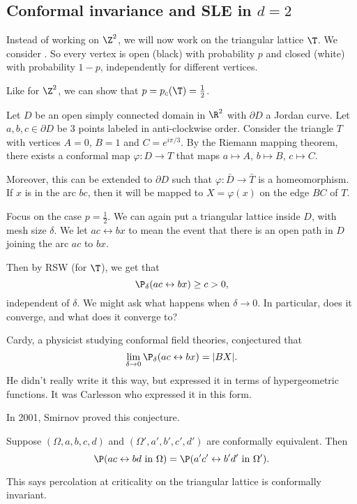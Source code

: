 \documentclass[a4paper]{article}
\begin{document}
\subsection{Conformal invariance and SLE in \texorpdfstring{$d = 2$}{d = 2}}
Instead of working on $\Z^2$, we will now work on the triangular lattice $\T$. We consider . So every vertex is open (black) with probability $p$ and closed (white) with probability $1 - p$, independently for different vertices.

Like for $\Z^2$, we can show that $p = p_c(\T) = \frac{1}{2}$.

Let $D$ be an open simply connected domain in $\R^2$ with $\partial D$ a Jordan curve. Let $a, b, c \in \partial D$ be $3$ points labeled in anti-clockwise order. Consider the triangle $T$ with vertices $A = 0$, $B = 1$ and $C = e^{i\pi/3}$. By the Riemann mapping theorem, there exists a conformal map $\varphi: D \to T$ that maps $a \mapsto A$, $b \mapsto B$, $c \mapsto C$.

Moreover, this can be extended to $\partial D$ such that $\varphi: \bar{D} \to \bar{T}$ is a homeomorphism. If $x$ is in the arc $bc$, then it will be mapped to $X = \varphi(x)$ on the edge $BC$ of $T$.

Focus on the case $p = \frac{1}{2}$. We can again put a triangular lattice inside $D$, with mesh size $\delta$. We let $ac \leftrightarrow bx$ to mean the event that there is an open path in $D$ joining the arc $ac$ to $bx$.

Then by RSW (for $\T$), we get that
\[
  \P_\delta(ac \leftrightarrow bx) \geq c > 0,
\]
independent of $\delta$. We might ask what happens when $\delta \to 0$. In particular, does it converge, and what does it converge to?

Cardy, a physicist studying conformal field theories, conjectured that
\[
  \lim_{\delta \to 0} \P_\delta(ac \leftrightarrow bx) = |BX|.
\]
He didn't really write it this way, but expressed it in terms of hypergeometric functions. It was Carlesson who expressed it in this form.

In 2001, Smirnov proved this conjecture.

\begin{thm}[Smirnov, 2001]
  Suppose $(\Omega, a, b, c, d)$ and $(\Omega', a', b', c', d')$ are conformally equivalent. Then
  \[
    \P(ac \leftrightarrow bd\text{ in }\Omega) = \P(a' c' \leftrightarrow b' d'\text{ in }\Omega').
  \]
\end{thm}
This says percolation at criticality on the triangular lattice is conformally invariant.
\end{document}
